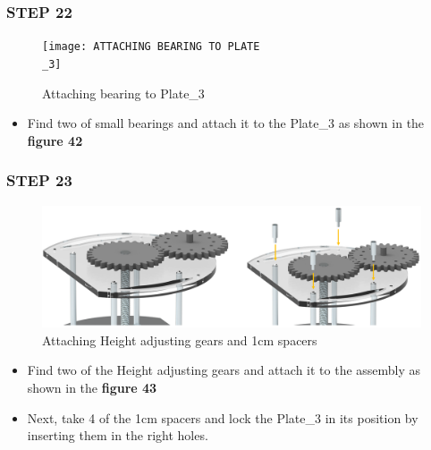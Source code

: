\documentclass[12pt,a4paper,oneside]{book}
\begin{document}
			\subsubsection*{STEP 22}
				\begin{figure}[H]
					\begin{center}
						\texttt{[image: ATTACHING BEARING TO PLATE\\\_3]}
						\caption{Attaching bearing to Plate\_3}
					\end{center}
				\end{figure}
				\begin{itemize}
					\item Find two of small bearings and attach it to the Plate\_3 as shown in the \textbf{figure 42}
				\end{itemize}
				
			\subsubsection*{STEP 23}
				\begin{figure}[H]
					\begin{center}
						\includegraphics[scale=0.5]{ATTACHING H_GEARS AND 1CM SPACERS}
						\caption{Attaching Height adjusting gears and 1cm spacers}
					\end{center}
				\end{figure}
				\begin{itemize}
					\item Find two of the Height adjusting gears and attach it to the assembly as shown in the \textbf{figure 43}
					\item Next, take 4 of the 1cm spacers and lock the Plate\_3 in its position by inserting them in the right holes.
				\end{itemize}
				
\end{document}
